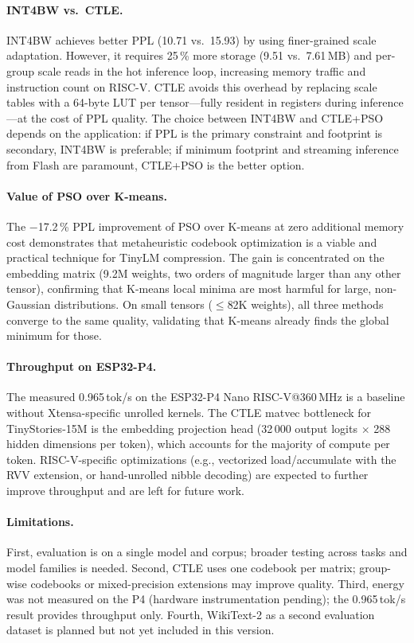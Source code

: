 \documentclass[lettersize,journal]{IEEEtran}
\begin{document}
\paragraph{INT4BW vs.\ CTLE.}
INT4BW achieves better PPL (10.71 vs.\ 15.93) by using finer-grained scale
adaptation.
However, it requires 25\,\% more storage (9.51 vs.\ 7.61\,MB) and per-group
scale reads in the hot inference loop, increasing memory traffic and instruction
count on RISC-V.
CTLE avoids this overhead by replacing scale tables with a 64-byte LUT per
tensor---fully resident in registers during inference---at the cost of PPL
quality.
The choice between INT4BW and CTLE+PSO depends on the application: if PPL is
the primary constraint and footprint is secondary, INT4BW is preferable; if
minimum footprint and streaming inference from Flash are paramount, CTLE+PSO
is the better option.

\paragraph{Value of PSO over K-means.}
The $-$17.2\,\% PPL improvement of PSO over K-means at zero additional memory
cost demonstrates that metaheuristic codebook optimization is a viable and
practical technique for TinyLM compression.
The gain is concentrated on the embedding matrix (9.2M weights, two orders of
magnitude larger than any other tensor), confirming that K-means local minima
are most harmful for large, non-Gaussian distributions.
On small tensors ($\leq$82K weights), all three methods converge to the same
quality, validating that K-means already finds the global minimum for those.

\paragraph{Throughput on ESP32-P4.}
The measured 0.965\,tok/s on the ESP32-P4 Nano RISC-V@360\,MHz is a baseline
without Xtensa-specific unrolled kernels.
The CTLE matvec bottleneck for TinyStories-15M is the embedding projection
head (32\,000 output logits $\times$ 288 hidden dimensions per token), which
accounts for the majority of compute per token.
RISC-V-specific optimizations (e.g., vectorized load/accumulate with the RVV
extension, or hand-unrolled nibble decoding) are expected to further improve
throughput and are left for future work.

\paragraph{Limitations.}
First, evaluation is on a single model and corpus; broader testing across
tasks and model families is needed.
Second, CTLE uses one codebook per matrix; group-wise codebooks or
mixed-precision extensions may improve quality.
Third, energy was not measured on the P4 (hardware instrumentation pending);
the 0.965\,tok/s result provides throughput only.
Fourth, WikiText-2 as a second evaluation dataset is planned but not yet
included in this version.
\end{document}
